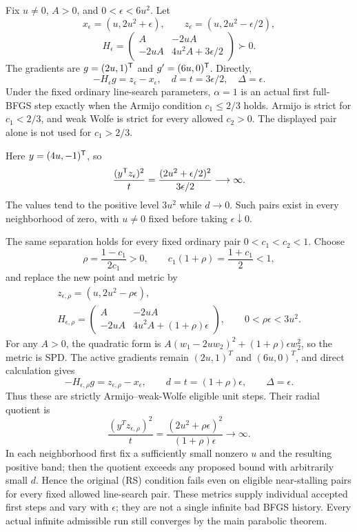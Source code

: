 Fix $u\ne0$, $A>0$, and $0<\epsilon<6u^2$. Let
\[
 x_\epsilon=(u,2u^2+\epsilon),\qquad
 z_\epsilon=(u,2u^2-\epsilon/2),
\]
\[
 H_\epsilon=
 \begin{pmatrix}
 A&-2uA\\-2uA&4u^2A+3\epsilon/2
 \end{pmatrix}\succ0.
\]
The gradients are $g=(2u,1)^{\mathsf T}$ and $g'=(6u,0)^{\mathsf T}$. Directly,
\[
 -H_\epsilon g=z_\epsilon-x_\epsilon,
 \quad d=t=3\epsilon/2,\quad \Delta=\epsilon.
\]
Under the fixed ordinary line-search parameters, $\alpha=1$ is an actual first full-BFGS step exactly when the Armijo condition $c_1\le2/3$ holds. Armijo is strict for $c_1<2/3$, and weak Wolfe is strict for every allowed $c_2>0$. The displayed pair alone is not used for $c_1>2/3$.

Here $y=(4u,-1)^{\mathsf T}$, so
\[
 \frac{(y^{\mathsf T} z_\epsilon)^2}{t}
 =\frac{(2u^2+\epsilon/2)^2}{3\epsilon/2}\longrightarrow\infty.
\]
The values tend to the positive level $3u^2$ while $d\to0$. Such pairs exist in every neighborhood of zero, with $u\ne0$ fixed before taking $\epsilon\downarrow0$.

The same separation holds for every fixed ordinary pair $0<c_1<c_2<1$. Choose
\[
 \rho=\frac{1-c_1}{2c_1}>0,
 \qquad c_1(1+\rho)=\frac{1+c_1}{2}<1,
\]
and replace the new point and metric by
\[
 \begin{gathered}
 z_{\epsilon,\rho}=(u,2u^2-\rho\epsilon),\\
 H_{\epsilon,\rho}=
 \begin{pmatrix}A&-2uA\\-2uA&4u^2A+(1+\rho)\epsilon\end{pmatrix},
 \qquad0<\rho\epsilon<3u^2.
 \end{gathered}
\]
For any $A>0$, the quadratic form is
$A(w_1-2uw_2)^2+(1+\rho)\epsilon w_2^2$, so the metric is SPD. The active gradients remain $(2u,1)^T$ and $(6u,0)^T$, and direct calculation gives
\[
 -H_{\epsilon,\rho}g=z_{\epsilon,\rho}-x_\epsilon,
 \qquad d=t=(1+\rho)\epsilon,\qquad\Delta=\epsilon.
\]
Thus these are strictly Armijo--weak-Wolfe eligible unit steps. Their radial quotient is
\[
 \frac{(y^Tz_{\epsilon,\rho})^2}{t}
 =\frac{(2u^2+\rho\epsilon)^2}{(1+\rho)\epsilon}
 \longrightarrow\infty.
\]
In each neighborhood first fix a sufficiently small nonzero $u$ and the resulting positive band; then the quotient exceeds any proposed bound with arbitrarily small $d$. Hence the original (RS) condition fails even on eligible near-stalling pairs for every fixed allowed line-search pair. These metrics supply individual accepted first steps and vary with $\epsilon$; they are not a single infinite bad BFGS history. Every actual infinite admissible run still converges by the main parabolic theorem.

